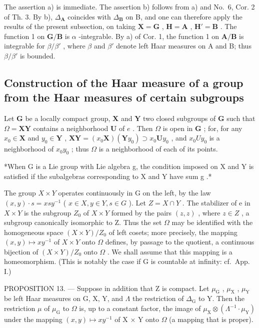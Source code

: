 The assertion a) is immediate. The assertion b) follows from a) and No.~6, Cor. 2 of Th. 3. By b), \(\Delta_{\mathbf{A}}\) coincides with \(\Delta_{\mathbf{B}}\) on B, and one can therefore apply the results of the present subsection, on taking \(\mathbf{X} = \mathbf{G}\) , \(\mathbf{H} = \mathbf{A}\) , \(\mathbf{H}' = \mathbf{B}\) . The function 1 on \(\mathbf{G} / \mathbf{B}\) is \(\alpha\) -integrable. By a) of Cor. 1, the function 1 on \(\mathbf{A} / \mathbf{B}\) is integrable for \(\beta / \beta'\) , where \(\beta\) and \(\beta'\) denote left Haar measures on A and B; thus \(\beta / \beta'\) is bounded.

\subsection{Construction of the Haar measure of a group from the Haar measures of certain subgroups}

Let \(\mathbf{G}\) be a locally compact group, \(\mathbf{X}\) and \(\mathbf{Y}\) two closed subgroups of \(\mathbf{G}\) such that \(\Omega = \mathbf{XY}\) contains a neighborhood \(\mathbf{U}\) of \(e\) . Then \(\Omega\) is open in \(\mathbf{G}\) ; for, for any \(x_0 \in \mathbf{X}\) and \(y_0 \in \mathbf{Y}\) , \(\mathbf{XY} = (x_0\mathbf{X})(\mathbf{Y}y_0) \supset x_0\mathbf{U}y_0\) , and \(x_{0}Uy_{0}\) is a neighborhood of \(x_{0}y_{0}\) ; thus \(\Omega\) is a neighborhood of each of its points.

*When G is a Lie group with Lie algebra g, the condition imposed on X and Y is satisfied if the subalgebras corresponding to X and Y have sum g .*

The group \(X \times Y\) operates continuously in G on the left, by the law \((x, y) \cdot s = xsy^{-1}\) ( \(x \in X, y \in Y, s \in G\) ). Let \(Z = X \cap Y\) . The stabilizer of e in \(X \times Y\) is the subgroup \(Z_{0}\) of \(X \times Y\) formed by the pairs \((z, z)\) , where \(z \in Z\) , a subgroup canonically isomorphic to Z. Thus the set \(\Omega\) may be identified with the homogeneous space \((X \times Y)/Z_{0}\) of left cosets; more precisely, the mapping \((x, y) \mapsto xy^{-1}\) of \(X \times Y\) onto \(\Omega\) defines, by passage to the quotient, a continuous bijection of \((X \times Y)/Z_{0}\) onto \(\Omega\) . We shall assume that this mapping is a homeomorphism. (This is notably the case if G is countable at infinity: cf.~App. I.)

PROPOSITION 13. --- Suppose in addition that Z is compact. Let \(\mu_{\mathrm{G}}\) , \(\mu_{\mathrm{X}}\) , \(\mu_{\mathrm{Y}}\) be left Haar measures on G, X, Y, and \(\Lambda\) the restriction of \(\Delta_{\mathrm{G}}\) to Y. Then the restriction \(\mu\) of \(\mu_{\mathrm{G}}\) to \(\Omega\) is, up to a constant factor, the image of \(\mu_{\mathrm{X}} \otimes (\Lambda^{-1} \cdot \mu_{\mathrm{Y}})\) under the mapping \((x, y) \mapsto xy^{-1}\) of X × Y onto \(\Omega\) (a mapping that is proper).

